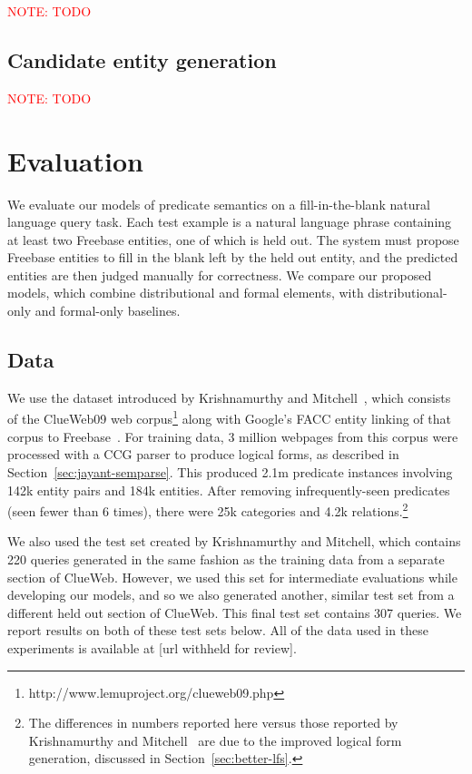 \documentclass[11pt]{article}
\newcommand{\secref}[1]{Section~\ref{sec:#1}}
\newcommand{\mattnote}[1]{\textcolor{red}{NOTE: #1}}
\begin{document}
\mattnote{TODO}

\subsection{Candidate entity generation}
\label{sec:better-candidates}

\mattnote{TODO}

\section{Evaluation}
\label{sec:evaluation}

We evaluate our models of predicate semantics on a fill-in-the-blank natural
language query task.  Each test example is a natural language phrase containing
at least two Freebase entities, one of which is held out.  The system must
propose Freebase entities to fill in the blank left by the held out entity, and
the predicted entities are then judged manually for correctness.  We compare
our proposed models, which combine distributional and formal elements, with
distributional-only and formal-only baselines.

\subsection{Data}

We use the dataset introduced by Krishnamurthy and
Mitchell~, which
consists of the ClueWeb09 web
corpus\footnote{http://www.lemuproject.org/clueweb09.php} along with Google's
FACC entity linking of that corpus to
Freebase~\cite{gabrilovich-2013-clueweb-entity-linking}.  For training data, 3
million webpages from this corpus were processed with a CCG parser to produce
logical forms, as described in \secref{jayant-semparse}.  This produced 2.1m
predicate instances involving 142k entity pairs and 184k entities.  After
removing infrequently-seen predicates (seen fewer than 6 times), there were 25k
categories and 4.2k relations.\footnote{The differences in numbers reported
here versus those reported by Krishnamurthy and
Mitchell~ are due to the
improved logical form generation, discussed in \secref{better-lfs}.}

We also used the test set created by Krishnamurthy and Mitchell, which contains
220 queries generated in the same fashion as the training data from a separate
section of ClueWeb.  However, we used this set for intermediate evaluations
while developing our models, and so we also generated another, similar test set
from a different held out section of ClueWeb.  This final test set contains 307
queries.  We report results on both of these test sets below.  All of the data
used in these experiments is available at [url withheld for review].
\end{document}
